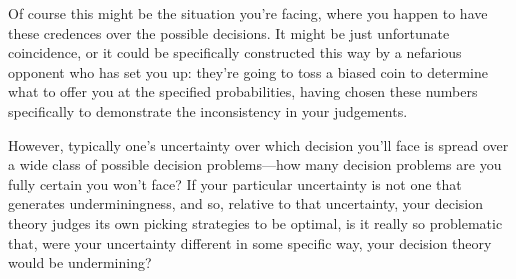 \documentclass[a4paper,final]{article}
\newcommand{\todoold}[2][]{\todo[backgroundcolor=white,bordercolor=orange!10,linecolor=gray!10, #1,caption={},textcolor=gray]{Pre-rev: #2}}
\renewcommand{\color}[1]{}
\newenvironment{colored}[1]{\leavevmode\color{#1}}{}
\newenvironment{CCM rewritten}
{\begingroup\color{blue}} %
{\endgroup}              %
\begin{document}
	Of course this might be the situation you're facing, where you happen to have these credences over the possible decisions. It might be just unfortunate coincidence, or it could be specifically constructed this way by a nefarious opponent who has set you up: they're going to toss a biased coin to determine what to offer you at the specified probabilities, having chosen these numbers specifically to demonstrate the inconsistency in your judgements. 
	
	However, typically one's uncertainty over which decision you'll face is spread over a wide class of possible decision problems---how many decision problems are you fully certain you won't face? If your particular uncertainty is not one that generates underminingness, and so, relative to that uncertainty, your decision theory judges its own picking strategies to be optimal, is it really so problematic that, were your uncertainty different in some specific way, your decision theory would be undermining?
	
	


%
%
\end{document}

